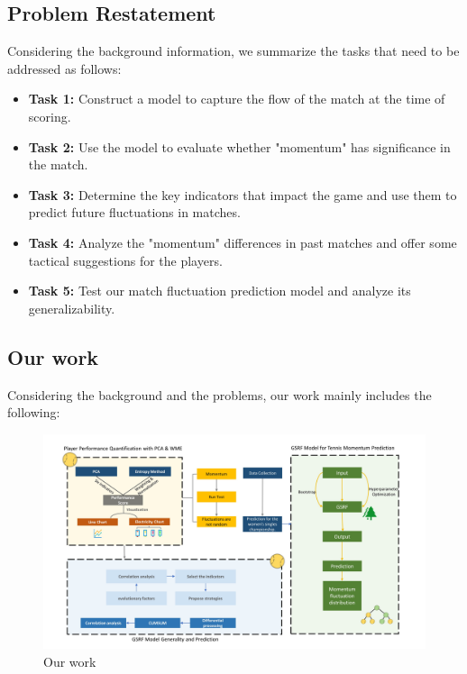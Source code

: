 \documentclass[12pt]{article}%
\begin{document}
	\subsection{Problem Restatement}
Considering the background information, we summarize the tasks that need to be addressed as follows:
	\begin{itemize}
		\setlength{\parsep}{0ex} %
		\setlength{\topsep}{2ex} %
		\setlength{\itemsep}{1ex} %
		\item \textbf{Task 1:} Construct a model to capture the flow of the match at the time of scoring.
		
		\item \textbf{Task 2:} Use the model to evaluate whether "momentum" has significance in the match.
		
		\item \textbf{Task 3:} Determine the key indicators that impact the game and use them to predict future fluctuations in matches.
		
		\item \textbf{Task 4:} Analyze the "momentum" differences in past matches and offer some tactical suggestions for the players. 
		
		\item \textbf{Task 5:} Test our match fluctuation prediction model and analyze its generalizability. 
		
	\end{itemize}
	
\clearpage
	\subsection{Our work}

Considering the background and the problems, our work mainly includes the following:	
\begin{figure}[H]
	\centering
	\includegraphics[scale=0.54]{figure//work.jpg}
		\caption{Our work}
	\label{11111}
\end{figure}
\end{document}
